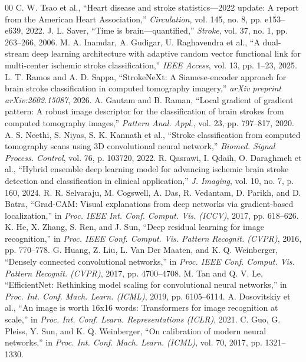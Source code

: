 \documentclass[conference]{IEEEtran}
\begin{document}
\balance

{\small
\begin{thebibliography}{00}
 C. W. Tsao et al., ``Heart disease and stroke statistics---2022 update: A report from the American Heart Association,'' \emph{Circulation}, vol. 145, no. 8, pp. e153--e639, 2022.
 J. L. Saver, ``Time is brain---quantified,'' \emph{Stroke}, vol. 37, no. 1, pp. 263--266, 2006.
 M. A. Inamdar, A. Gudigar, U. Raghavendra et al., ``A dual-stream deep learning architecture with adaptive random vector functional link for multi-center ischemic stroke classification,'' \emph{IEEE Access}, vol. 13, pp. 1--23, 2025.
 L. T. Ramos and A. D. Sappa, ``StrokeNeXt: A Siamese-encoder approach for brain stroke classification in computed tomography imagery,'' \emph{arXiv preprint arXiv:2602.15087}, 2026.
 A. Gautam and B. Raman, ``Local gradient of gradient pattern: A robust image descriptor for the classification of brain strokes from computed tomography images,'' \emph{Pattern Anal. Appl.}, vol. 23, pp. 797--817, 2020.
 A. S. Neethi, S. Niyas, S. K. Kannath et al., ``Stroke classification from computed tomography scans using 3D convolutional neural network,'' \emph{Biomed. Signal Process. Control}, vol. 76, p. 103720, 2022.
 R. Qasrawi, I. Qdaih, O. Daraghmeh et al., ``Hybrid ensemble deep learning model for advancing ischemic brain stroke detection and classification in clinical application,'' \emph{J. Imaging}, vol. 10, no. 7, p. 160, 2024.
 R. R. Selvaraju, M. Cogswell, A. Das, R. Vedantam, D. Parikh, and D. Batra, ``Grad-CAM: Visual explanations from deep networks via gradient-based localization,'' in \emph{Proc. IEEE Int. Conf. Comput. Vis. (ICCV)}, 2017, pp. 618--626.
 K. He, X. Zhang, S. Ren, and J. Sun, ``Deep residual learning for image recognition,'' in \emph{Proc. IEEE Conf. Comput. Vis. Pattern Recognit. (CVPR)}, 2016, pp. 770--778.
 G. Huang, Z. Liu, L. Van Der Maaten, and K. Q. Weinberger, ``Densely connected convolutional networks,'' in \emph{Proc. IEEE Conf. Comput. Vis. Pattern Recognit. (CVPR)}, 2017, pp. 4700--4708.
 M. Tan and Q. V. Le, ``EfficientNet: Rethinking model scaling for convolutional neural networks,'' in \emph{Proc. Int. Conf. Mach. Learn. (ICML)}, 2019, pp. 6105--6114.
 A. Dosovitskiy et al., ``An image is worth 16x16 words: Transformers for image recognition at scale,'' in \emph{Proc. Int. Conf. Learn. Representations (ICLR)}, 2021.
 C. Guo, G. Pleiss, Y. Sun, and K. Q. Weinberger, ``On calibration of modern neural networks,'' in \emph{Proc. Int. Conf. Mach. Learn. (ICML)}, vol. 70, 2017, pp. 1321--1330.

\end{thebibliography}}
\end{document}
